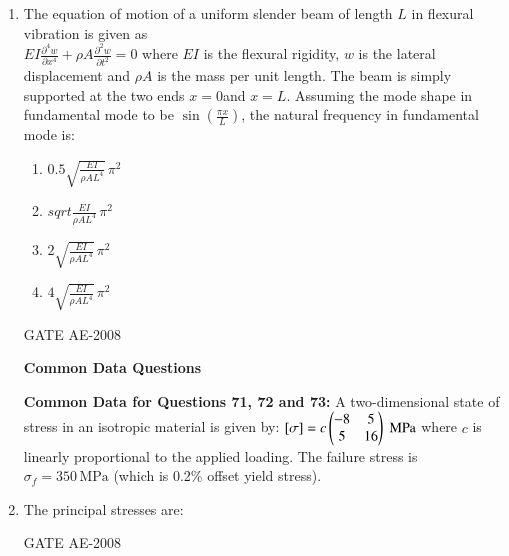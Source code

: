 \documentclass[journal,12pt,onecolumn]{IEEEtran}
\theoremstyle{remark}
\begin{document}
\begin{enumerate}
\quad 

\item  The equation of motion of a uniform slender beam of length \( L \) in flexural vibration is given as\\
$
EI \frac{\partial^4 w}{\partial x^4} + \rho A \frac{\partial^2 w}{\partial t^2} = 0
$
where $EI$ is the flexural rigidity, $w$ is the lateral displacement and $ \rho A $ is the mass per unit length.  
The beam is simply supported at the two ends $x = 0 $and $x = L $.  
Assuming the mode shape in fundamental mode to be $ \sin\left( \frac{\pi x}{L} \right) $,  
the natural frequency in fundamental mode is:\\

\begin{enumerate}[label=\Alph*.]
    
\item $ 0.5 \sqrt{\frac{EI}{\rho A L^4}} \, \pi^2 $\\
\item $sqrt{\frac{EI}{\rho A L^4}} \, \pi^2 $\\
\item $ 2 \sqrt{\frac{EI}{\rho A L^4}} \, \pi^2$ \\
\item $ 4 \sqrt{\frac{EI}{\rho A L^4}} \, \pi^2$
\end{enumerate}
\hfill{GATE AE-2008}

\quad 

\textbf{Common Data Questions}  

\quad

\textbf{Common Data for Questions 71, 72 and 73:}  
A two-dimensional state of stress in an isotropic material is given by:
$
[\sigma] = c 
\begin{pmatrix}
-8 & 5 \\
5 & 16
\end{pmatrix} \; \text{MPa}
$
where $c$ is linearly proportional to the applied loading.  
The failure stress is $ \sigma_f = 350 \, \text{MPa}$ (which is 0.2\% offset yield stress).\\

\item The principal stresses are:  \\

\begin{enumerate}
\end{enumerate}
\hfill{GATE AE-2008}


\end{enumerate}
\end{document}
